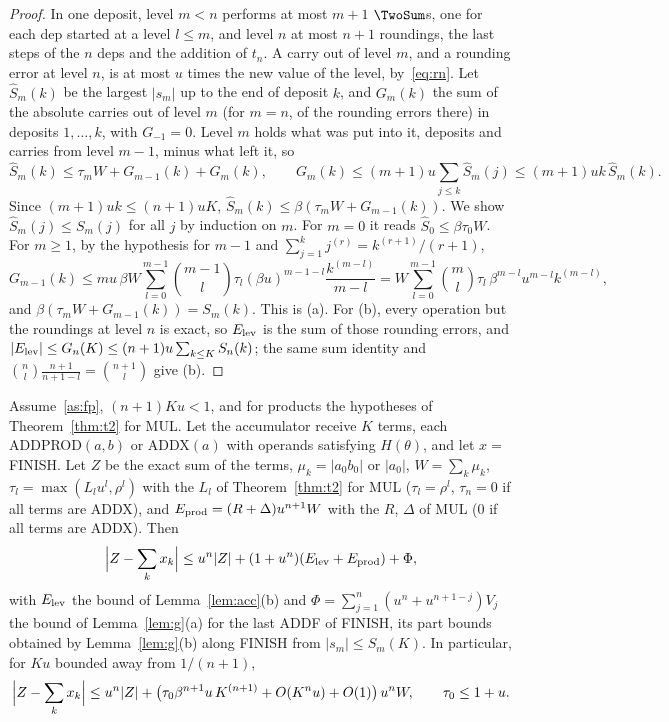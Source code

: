 \begin{proof}
In one deposit, level $m < n$ performs at most $m+1$ $\TwoSum$s, one for each dep started at a level $l \le m$, and
level $n$ at most $n+1$ roundings, the last steps of the $n$ deps and the addition of $t_n$. A carry out of level $m$,
and a rounding error at level $n$, is at most $u$ times the new value of the level, by~\eqref{eq:rn}. Let $\hat S_m(k)$
be the largest $|s_m|$ up to the end of deposit $k$, and $G_m(k)$ the sum of the absolute carries out of level $m$
(for $m = n$, of the rounding errors there) in deposits $1, \dots, k$, with $G_{-1} = 0$. Level $m$ holds what was put
into it, deposits and carries from level $m-1$, minus what left it, so
\[
\hat S_m(k) \le \tau_m W + G_{m-1}(k) + G_m(k), \qquad G_m(k) \le (m+1)u\sum_{j \le k}\hat S_m(j) \le (m+1)uk\,\hat
S_m(k).
\]
Since $(m+1)uk \le (n+1)uK$, $\hat S_m(k) \le \beta(\tau_mW + G_{m-1}(k))$. We show $\hat S_m(j) \le S_m(j)$ for all
$j$ by induction on $m$. For $m = 0$ it reads $\hat S_0 \le \beta\tau_0W$. For $m \ge 1$, by the hypothesis for
$m - 1$ and $\sum_{j=1}^{k} j^{(r)} = k^{(r+1)}/(r+1)$,
\[
G_{m-1}(k) \le mu\,\beta W\sum_{l=0}^{m-1}\binom{m-1}{l}\tau_l(\beta u)^{m-1-l}\frac{k^{(m-l)}}{m-l} = W\sum_{l=0}^{m-1}
\binom{m}{l}\tau_l\,\beta^{m-l}u^{m-l}k^{(m-l)},
\]
and $\beta(\tau_mW + G_{m-1}(k)) = S_m(k)$. This is (a). For (b), every operation but the roundings at level $n$ is
exact, so $E_{\rm lev}$ is the sum of those rounding errors, and $|E_{\rm lev}| \le G_n(K) \le (n+1)u\sum_{k \le K}
S_n(k)$; the same sum identity and $\binom{n}{l}\frac{n+1}{n+1-l} = \binom{n+1}{l}$ give (b).
\end{proof}

\begin{theorem}\label{thm:acc}
Assume~\ref{as:fp}, $(n+1)Ku < 1$, and for products the hypotheses of Theorem~\ref{thm:t2} for MUL. Let the accumulator
receive $K$ terms, each ADDPROD$(a, b)$ or ADDX$(a)$ with operands satisfying $H(\theta)$, and let $x = $ FINISH. Let
$Z$ be the exact sum of the terms, $\mu_k = |a_0b_0|$ or $|a_0|$, $W = \sum_k\mu_k$, $\tau_l = \max(L_lu^l,
\rho^l)$ with the $L_l$ of Theorem~\ref{thm:t2} for MUL ($\tau_l = \rho^l$, $\tau_n = 0$ if all terms are ADDX), and
$E_{\rm prod} = (R + \Delta)u^{n+1}W$ with the $R$, $\Delta$ of MUL ($0$ if all terms are ADDX). Then
\[
\Bigl|Z - \sum_k x_k\Bigr| \le u^n|Z| + (1 + u^n)(E_{\rm lev} + E_{\rm prod}) + \Phi,
\]
with $E_{\rm lev}$ the bound of Lemma~\ref{lem:acc}(b) and $\Phi = \sum_{j=1}^{n}(u^n + u^{n+1-j})V_j$ the bound of
Lemma~\ref{lem:g}(a) for the last ADDF of FINISH, its part bounds obtained by Lemma~\ref{lem:g}(b) along FINISH from
$|s_m| \le S_m(K)$. In particular, for $Ku$ bounded away from $1/(n+1)$,
\[
\Bigl|Z - \sum_k x_k\Bigr| \le u^n|Z| + \bigl(\tau_0\beta^{n+1}u\,K^{(n+1)} + O(K^nu) + O(1)\bigr)\,u^nW, \qquad \tau_0 \le
1 + u.
\]
\end{theorem}


